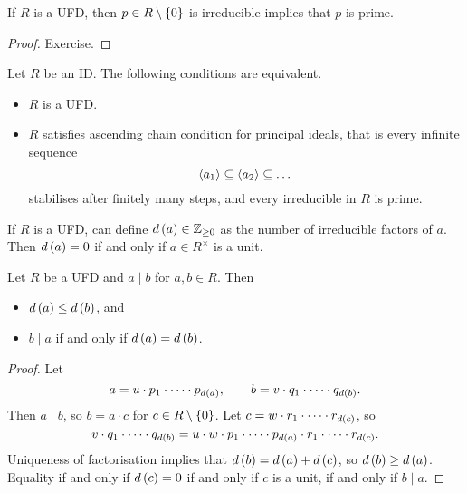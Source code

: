 \begin{lemma}
If $ R $ is a UFD, then $ p \in R \setminus \cbr{0} $ is irreducible implies that $ p $ is prime.
\end{lemma}

\begin{proof}
Exercise.
\end{proof}

\begin{theorem}
\label{thm:ufd}
Let $ R $ be an ID. The following conditions are equivalent.
\begin{itemize}
\item $ R $ is a UFD.
\item $ R $ satisfies ascending chain condition for principal ideals, that is every infinite sequence
$$ \left\langle a_1 \right\rangle \subseteq \left\langle a_2 \right\rangle \subseteq \dots $$
stabilises after finitely many steps, and every irreducible in $ R $ is prime.
\end{itemize}
\end{theorem}

If $ R $ is a UFD, can define $ d\br{a} \in \Z_{\ge 0} $ as the number of irreducible factors of $ a $. Then $ d\br{a} = 0 $ if and only if $ a \in R^\times $ is a unit.

\begin{lemma}
Let $ R $ be a UFD and $ a \mid b $ for $ a, b \in R $. Then
\begin{itemize}
\item $ d\br{a} \le d\br{b} $, and
\item $ b \mid a $ if and only if $ d\br{a} = d\br{b} $.
\end{itemize}
\end{lemma}


\begin{proof}
Let
$$ a = u \cdot p_1 \cdot \dots \cdot p_{d\br{a}}, \qquad b = v \cdot q_1 \cdot \dots \cdot q_{d\br{b}}. $$
Then $ a \mid b $, so $ b = a \cdot c $ for $ c \in R \setminus \cbr{0} $. Let $ c = w \cdot r_1 \cdot \dots \cdot r_{d\br{c}} $, so
$$ v \cdot q_1 \cdot \dots \cdot q_{d\br{b}} = u \cdot w \cdot p_1 \cdot \dots \cdot p_{d\br{a}} \cdot r_1 \cdot \dots \cdot r_{d\br{c}}. $$
Uniqueness of factorisation implies that $ d\br{b} = d\br{a} + d\br{c} $, so $ d\br{b} \ge d\br{a} $. Equality if and only if $ d\br{c} = 0 $ if and only if $ c $ is a unit, if and only if $ b \mid a $.
\end{proof}

